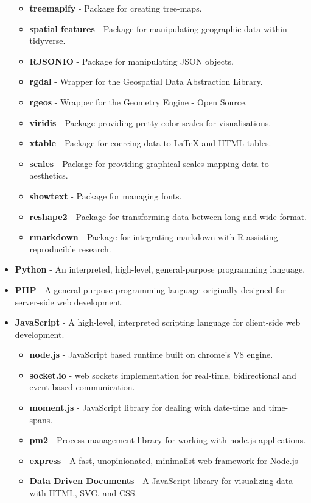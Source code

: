 \begin{itemize}
\begin{itemize}
      \item \textbf{treemapify} - Package for creating tree-maps.
      \item \textbf{spatial features} - Package for manipulating geographic data within tidyverse.
      \item \textbf{RJSONIO} - Package for manipulating JSON objects.
      \item \textbf{rgdal} - Wrapper for the Geospatial Data Abstraction Library.
      \item \textbf{rgeos} - Wrapper for the Geometry Engine - Open Source.
      \item \textbf{viridis} - Package providing pretty color scales for visualisations. 
      \item \textbf{xtable} - Package for coercing data to LaTeX and HTML tables.
      \item \textbf{scales} - Package for providing graphical scales mapping data to aesthetics.
      \item \textbf{showtext} - Package for managing fonts. 
      \item \textbf{reshape2} - Package for transforming data between long and wide format.
      \item \textbf{rmarkdown} - Package for integrating markdown with R assisting reproducible research.
    \end{itemize}
  \item \textbf{Python} - An interpreted, high-level, general-purpose programming language.
  \item \textbf{PHP} - A general-purpose programming language originally designed for server-side web development.
  \item \textbf{JavaScript} - A high-level, interpreted scripting language for client-side web development.
    \begin{itemize}
      \item \textbf{node.js} - JavaScript based runtime built on chrome's V8 engine.
      \item \textbf{socket.io} - web sockets implementation for real-time, bidirectional and event-based communication.
      \item \textbf{moment.js} - JavaScript library for dealing with date-time and time-spans.
      \item \textbf{pm2} - Process management library for working with node.js applications.
      \item \textbf{express} - A fast, unopinionated, minimalist web framework for Node.js
      \item \textbf{Data Driven Documents} - A JavaScript library for visualizing data with HTML, SVG, and CSS.

\end{itemize}
\end{itemize}
